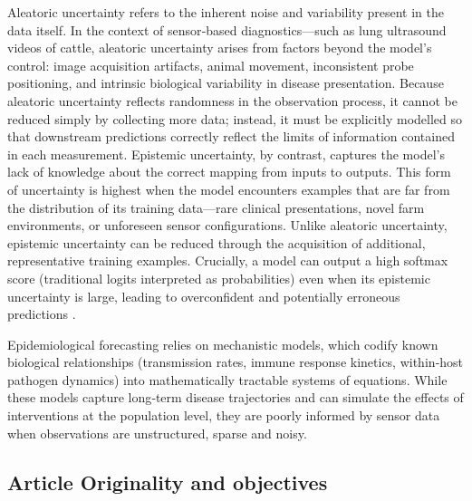 Aleatoric uncertainty refers to the inherent noise and variability present in the data itself. In the context of sensor‑based diagnostics—such as lung ultrasound videos of cattle, aleatoric uncertainty arises from factors beyond the model’s control: image acquisition artifacts, animal movement, inconsistent probe positioning, and intrinsic biological variability in disease presentation. Because aleatoric uncertainty reflects randomness in the observation process, it cannot be reduced simply by collecting more data; instead, it must be explicitly modelled so that downstream predictions correctly reflect the limits of information contained in each measurement. Epistemic uncertainty, by contrast, captures the model’s lack of knowledge about the correct mapping from inputs to outputs. This form of uncertainty is highest when the model encounters examples that are far from the distribution of its training data—rare clinical presentations, novel farm environments, or unforeseen sensor configurations. Unlike aleatoric uncertainty, epistemic uncertainty can be reduced through the acquisition of additional, representative training examples. Crucially, a model can output a high softmax score (traditional logits interpreted as probabilities) even when its epistemic uncertainty is large, leading to overconfident and potentially erroneous predictions \cite{gal_dropout_2016}.

Epidemiological forecasting relies on mechanistic models, which codify known biological relationships (transmission rates, immune response kinetics, within‑host pathogen dynamics) into mathematically tractable systems of equations. While these models capture long‑term disease trajectories and can simulate the effects of interventions at the population level, they are poorly informed by sensor data when observations are unstructured, sparse and noisy.




\subsection{Article Originality and objectives}

